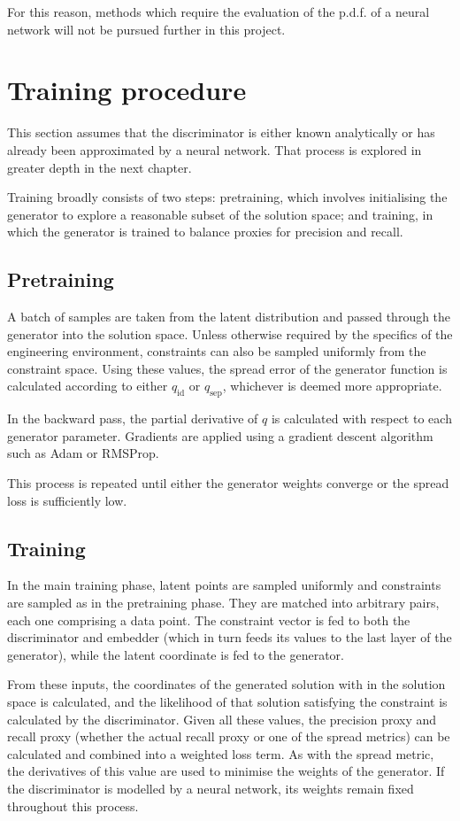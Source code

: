 \documentclass[../../main.tex]{subfiles}
\begin{document}
For this reason, methods which require the evaluation of the p.d.f. of a neural network will not be pursued further in this project.

\section{Training procedure}

This section assumes that the discriminator is either known analytically or has already been approximated by a neural network.
That process is explored in greater depth in the next chapter.

Training broadly consists of two steps: pretraining, which involves initialising the generator to explore a reasonable subset of the solution space; and training, in which the generator is trained to balance proxies for precision and recall.

\subsection{Pretraining}

A batch of samples are taken from the latent distribution and passed through the generator into the solution space.
Unless otherwise required by the specifics of the engineering environment, constraints can also be sampled uniformly from the constraint space.
Using these values, the spread error of the generator function is calculated according to either $q_\text{id}$ or $q_\text{sep}$, whichever is deemed more appropriate.

In the backward pass, the partial derivative of $q$ is calculated with respect to each generator parameter.
Gradients are applied using a gradient descent algorithm such as Adam or RMSProp.

This process is repeated until either the generator weights converge or the spread loss is sufficiently low.

\subsection{Training}

In the main training phase, latent points are sampled uniformly and constraints are sampled as in the pretraining phase.
They are matched into arbitrary pairs, each one comprising a data point.
The constraint vector is fed to both the discriminator and embedder (which in turn feeds its values to the last layer of the generator), while the latent coordinate is fed to the generator.

From these inputs, the coordinates of the generated solution with in the solution space is calculated, and the likelihood of that solution satisfying the constraint is calculated by the discriminator.
Given all these values, the precision proxy and recall proxy (whether the actual recall proxy or one of the spread metrics) can be calculated and combined into a weighted loss term.
As with the spread metric, the derivatives of this value are used to minimise the weights of the generator.
If the discriminator is modelled by a neural network, its weights remain fixed throughout this process.
\end{document}
